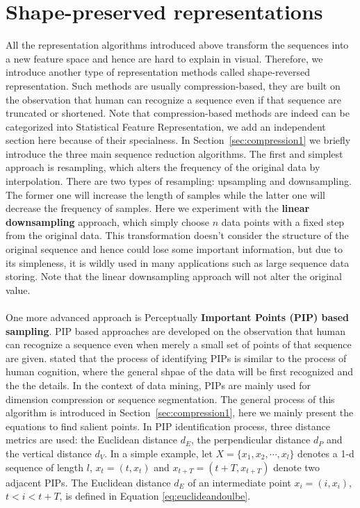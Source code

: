 \section{Shape-preserved representations}
\label{sec:pippaa}
All the representation algorithms introduced above transform the sequences into a new feature space and hence are hard to explain in visual. Therefore, we introduce another type of representation methods called shape-reversed representation. Such methods are usually compression-based, they are built on the observation that human can recognize a sequence even if that sequence are truncated or shortened. Note that compression-based methods are indeed can be categorized into Statistical Feature Representation, we add an independent section here because of their specialness. In Section~\ref{sec:compression1} we briefly introduce the three main sequence reduction algorithms. The first and simplest approach is resampling, which alters the frequency of the original data by interpolation. There are two types of resampling: upsampling and downsampling. The former one will increase the length of samples while the latter one will decrease the frequency of samples. Here we experiment with the \textbf{linear downsampling} approach, which simply choose $n$ data points with a fixed step from the original data. This transformation doesn't consider the structure of the original sequence and hence could lose some important information, but due to its simpleness, it is wildly used in many applications such as large sequence data storing. Note that the linear downsampling approach will not alter the original value. \\
\\One more advanced approach is Perceptually \textbf{Important Points (PIP) based sampling}. PIP based approaches are developed on the observation that human can recognize a sequence even when merely a small set of points of that sequence are given. \cite{zaib2004pattern} stated that the process of identifying PIPs is similar to the process of human cognition, where the general shpae of the data will be first recognized and the the details. In the context of data mining, PIPs are mainly used for dimension compression or sequence segmentation. The general process of this algorithm is introduced in Section~\ref{sec:compression1}, here we mainly present the equations to find salient points. In PIP identification process, three distance metrics are used: the Euclidean distance $d_E$, the perpendicular distance $d_P$ and the vertical distance $d_V$. In a simple example, let $X = \{x_1,x_2, \cdots, x_l\}$ denotes a 1-d sequence of length $l$, $x_t = (t, x_t)$ and $ x_{t+T} = (t+T,x_{t+T})$ denote two adjacent PIPs. The Euclidean distance $d_E$ of an intermediate point $x_i = (i, x_i)$, $t < i < t+T$, is defined in Equation \ref{eq:euclideandoulbe}. 
